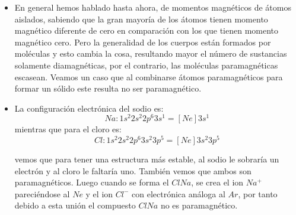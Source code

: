 \begin{itemize}
	\item En general hemos hablado hasta ahora, de momentos magnéticos de átomos aislados, sabiendo que la gran mayoría de los átomos tienen momento magnético diferente de cero en comparación con los que tienen momento magnético cero. Pero la generalidad de los cuerpos están formados por moléculas y esto cambia la cosa, resultando mayor el número de sustancias solamente diamagnéticas, por el contrario, las moléculas paramagnéticas escasean. Veamos un caso que al combinarse átomos paramagnéticos para formar un sólido este resulta no ser paramagnético.
	\item La configuración electrónica del sodio es:\\
	\begin{equation}
		Na: 1s^{2} 2s^{2} 2p^{6} 3s^{1}  = [Ne]3s^{1}	
	\end{equation}		
mientras que para el cloro es:
	\begin{equation}
	Cl: 1s^{2} 2s^{2} 2p^{6} 3s^{2} 3p^{5}  = [Ne]3s^{2} 3p^{5}
	\end{equation}
	
vemos que para tener una estructura más estable, al sodio le sobraría un electrón y al cloro le faltaría uno. También vemos que ambos son paramagnéticos. Luego cuando se forma el $ClNa$, se crea el ion $Na^{+}$ pareciéndose al $Ne$ y el ion $Cl^{-}$ con electrónica análoga al $Ar$, por tanto debido a esta unión el compuesto $ClNa$ no es paramagnético.
\end{itemize}


%
%
%

